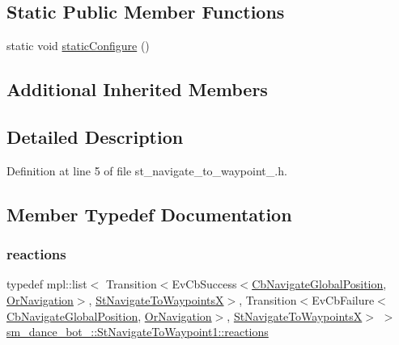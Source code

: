 \subsection*{Static Public Member Functions}
\begin{DoxyCompactItemize}
\item 
static void \hyperlink{structsm__dance__bot__2_1_1StNavigateToWaypoint1_a5461cc9743f6f36ab01092d59e65c75d}{static\+Configure} ()
\end{DoxyCompactItemize}
\subsection*{Additional Inherited Members}


\subsection{Detailed Description}


Definition at line 5 of file st\+\_\+navigate\+\_\+to\+\_\+waypoint\+\_.\+h.



\subsection{Member Typedef Documentation}
\mbox{\label{structsm__dance__bot__2_1_1StNavigateToWaypoint1_a8351842b595de4eb153c7b838360727d}} 
\subsubsection{\texorpdfstring{reactions}{reactions}}
{\footnotesize\ttfamily typedef mpl\+::list$<$ Transition$<$Ev\+Cb\+Success$<$\hyperlink{classcl__move__base__z_1_1CbNavigateGlobalPosition}{Cb\+Navigate\+Global\+Position}, \hyperlink{classsm__dance__bot__2_1_1OrNavigation}{Or\+Navigation}$>$, \hyperlink{structsm__dance__bot__2_1_1StNavigateToWaypointsX}{St\+Navigate\+To\+WaypointsX}$>$, Transition$<$Ev\+Cb\+Failure$<$\hyperlink{classcl__move__base__z_1_1CbNavigateGlobalPosition}{Cb\+Navigate\+Global\+Position}, \hyperlink{classsm__dance__bot__2_1_1OrNavigation}{Or\+Navigation}$>$, \hyperlink{structsm__dance__bot__2_1_1StNavigateToWaypointsX}{St\+Navigate\+To\+WaypointsX}$>$ $>$ \hyperlink{structsm__dance__bot__2_1_1StNavigateToWaypoint1_a8351842b595de4eb153c7b838360727d}{sm\+\_\+dance\+\_\+bot\+\_\+::\+St\+Navigate\+To\+Waypoint1\+::reactions}}




